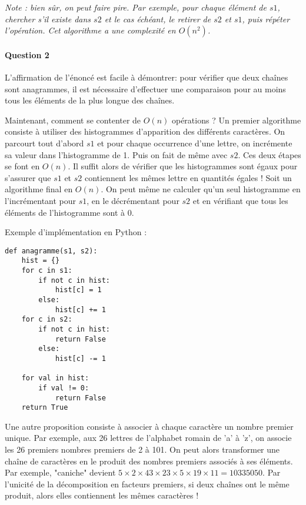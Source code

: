 \documentclass{article}%
\begin{document}
\textit{Note : bien sûr, on peut faire pire. Par exemple, pour chaque élément de $s1$, chercher s'il existe dans $s2$ et le cas échéant, le retirer de $s2$ et $s1$, puis répéter l'opération. Cet algorithme a une complexité en $O(n^2)$.}

\paragraph{Question 2} L'affirmation de l'énoncé est facile à démontrer: pour vérifier que deux chaînes sont anagrammes, il est nécessaire d'effectuer une comparaison pour au moins tous les éléments de la plus longue des chaînes.

Maintenant, comment se contenter de $O(n)$ opérations ? Un premier algorithme consiste à utiliser des histogrammes d'apparition des différents caractères. On parcourt tout d'abord $s1$ et pour chaque occurrence d'une lettre, on incrémente sa valeur dans l'histogramme de 1. Puis on fait de même avec $s2$. Ces deux étapes se font en $O(n)$. Il suffit alors de vérifier que les histogrammes sont égaux pour s'assurer que $s1$ et $s2$ contiennent les mêmes lettre en quantités égales ! Soit un algorithme final en $O(n)$. On peut même ne calculer qu'un seul histogramme en l'incrémentant pour $s1$, en le décrémentant pour $s2$ et en vérifiant que tous les éléments de l'histogramme sont à 0.

Exemple d'implémentation en Python :
\begin{verbatim}
def anagramme(s1, s2):
    hist = {}
    for c in s1:
        if not c in hist:
            hist[c] = 1
        else:
            hist[c] += 1
    for c in s2:
        if not c in hist:
            return False
        else:
            hist[c] -= 1
    
    for val in hist:
        if val != 0:
            return False
    return True
\end{verbatim}

Une autre proposition consiste à associer à chaque caractère un nombre premier unique. Par exemple, aux 26 lettres de l'alphabet romain de 'a' à 'z', on associe les 26 premiers nombres premiers de 2 à 101. On peut alors transformer une chaîne de caractères en le produit des nombres premiers associés à ses éléments. Par exemple, "caniche" devient $5\times2\times43\times23\times5\times19\times11 = 10335050$. Par l'unicité de la décomposition en facteurs premiers, si deux chaînes ont le même produit, alors elles contiennent les mêmes caractères !
\end{document}
